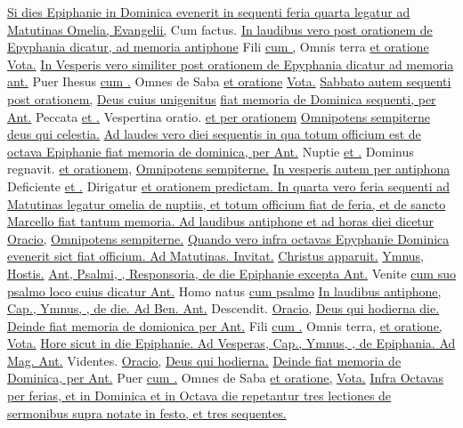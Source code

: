 \begin{multicols*}{2}
\newline \ul{Si dies Epiphanie in Dominica evenerit in sequenti feria quarta legatur ad Matutinas Omelia, Evangelii,} Cum factus. \ul{In laudibus vero post orationem de Epyphania dicatur, ad memoria antiphone} Fili \ul{cum \Vbar ,} Omnis terra \ul{et oratione} \hyperlink{vota-quesumus-epiphanie}{Vota.} \ul{In Vesperis vero similiter post orationem de Epyphania dicatur ad memoria ant.} Puer Ihesus \ul{cum \Vbar .} Omnes de Saba \ul{et oratione} \hyperlink{vota-quesumus-epiphanie}{Vota.} \ul{Sabbato autem sequenti post orationem,} \hyperlink{deus-cuius-unigenitus-epiphanie}{Deus cuius unigenitus} \ul{fiat memoria de Dominica sequenti, per Ant.} Peccata \ul{et \Vbar .} Vespertina oratio. \ul{et per orationem} \hyperlink{omnipotens-sempiterne-dom-i-post}{Omnipotens sempiterne deus qui celestia.} \ul{Ad laudes vero diei sequentis in qua totum officium est de octava Epiphanie fiat memoria de dominica, per Ant.} Nuptie \ul{et \Vbar .} Dominus regnavit. \ul{et orationem,} \hyperlink{omnipotens-sempiterne-dom-i-post}{Omnipotens sempiterne.} \ul{In vesperis autem per antiphona} Deficiente \ul{et \Vbar .} Dirigatur \ul{et orationem predictam. In quarta vero feria sequenti ad Matutinas legatur omelia de nuptiis, et totum officium fiat de feria, et de sancto Marcello fiat tantum memoria. Ad laudibus antiphone et ad horas diei dicetur Oracio,} \hyperlink{omnipotens-sempiterne-dom-i-post}{Omnipotens sempiterne.} \ul{Quando vero infra octavas Epyphanie Dominica evenerit sict fiat officium. Ad Matutinas. Invitat.} \hyperlink{christus-apparuit-invitatorium}{Christus apparuit.} \ul{Ymnus,} \hyperlink{hostis-herodes}{Hostis.} \ul{Ant, Psalmi, \Vbar , Responsoria, de die Epiphanie excepta Ant.} Venite \ul{cum suo psalmo loco cuius dicatur Ant.} Homo natus \ul{cum psalmo}  \ul{In laudibus antiphone, Cap., Ymnus, \Vbar , de die. Ad Ben. Ant.} Descendit. \ul{Oracio,} \hyperlink{deus-qui-hodierna-epiphanie}{Deus qui hodierna die.} \ul{Deinde fiat memoria de domionica per Ant.} Fili \ul{cum \Vbar .} Omnis terra, \ul{et oratione,} \hyperlink{vota-quesumus-epiphanie}{Vota.} \ul{Hore sicut in die Epiphanie. Ad Vesperas, Cap., Ymnus, \Vbar , de Epiphania. Ad Mag. Ant.} Videntes. \ul{Oracio,} \hyperlink{deus-qui-hodierna-epiphanie}{Deus qui hodierna.} \ul{Deinde fiat memoria de Dominica, per Ant.} Puer \ul{cum \Vbar .} Omnes de Saba \ul{et oratione,} \hyperlink{vota-quesumus-epiphanie}{Vota.} \ul{Infra Octavas per ferias, et in Dominica et in Octava die repetantur tres lectiones de sermonibus supra notate in festo, et tres sequentes.}

\end{multicols*}
